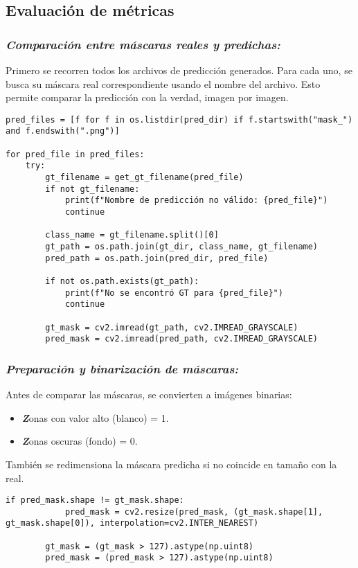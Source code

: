 \documentclass[12pt]{article}
\begin{document}
\subsection{Evaluación de métricas }
\subsubsection{\textit{Comparación entre máscaras reales y predichas:}}
Primero se recorren todos los archivos de predicción generados.
Para cada uno, se busca su máscara real correspondiente usando el nombre del archivo.
Esto permite comparar la predicción con la verdad, imagen por imagen.
\begin{lstlisting}[caption={Recorrer predicciones y obtener la GT}, label=lst:metrics_compare]
pred_files = [f for f in os.listdir(pred_dir) if f.startswith("mask_") and f.endswith(".png")]

for pred_file in pred_files:
    try:
        gt_filename = get_gt_filename(pred_file)
        if not gt_filename:
            print(f"Nombre de predicción no válido: {pred_file}")
            continue

        class_name = gt_filename.split()[0]
        gt_path = os.path.join(gt_dir, class_name, gt_filename)
        pred_path = os.path.join(pred_dir, pred_file)

        if not os.path.exists(gt_path):
            print(f"No se encontró GT para {pred_file}")
            continue

        gt_mask = cv2.imread(gt_path, cv2.IMREAD_GRAYSCALE)
        pred_mask = cv2.imread(pred_path, cv2.IMREAD_GRAYSCALE)
\end{lstlisting}
\subsubsection{\textit{Preparación y binarización de máscaras:}}
Antes de comparar las máscaras, se convierten a imágenes binarias:
\begin{itemize}
    \item \textit\textbf Zonas con valor alto (blanco) = 1.
    \item \textit \textbf Zonas oscuras (fondo) = 0.
\end{itemize}
También se redimensiona la máscara predicha si no coincide en tamaño con la real.
\begin{lstlisting}[caption={Normalización y binarización de máscaras}, label=lst:metrics_binarize]
        if pred_mask.shape != gt_mask.shape:
            pred_mask = cv2.resize(pred_mask, (gt_mask.shape[1], gt_mask.shape[0]), interpolation=cv2.INTER_NEAREST)

        gt_mask = (gt_mask > 127).astype(np.uint8)
        pred_mask = (pred_mask > 127).astype(np.uint8)
\end{lstlisting}
\end{document}
